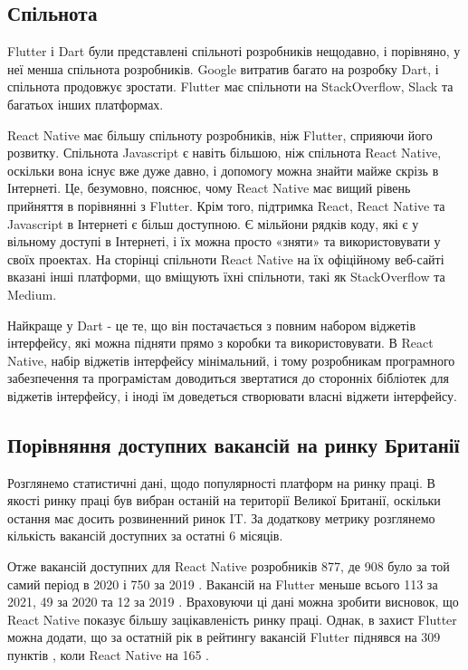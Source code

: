 \subsection{Спільнота}
\label{subsec:communities}

Flutter і Dart були представлені спільноті розробників нещодавно, і порівняно, у неї менша спільнота розробників.
Google витратив багато на розробку Dart, і спільнота продовжує зростати.
Flutter має спільноти на StackOverflow, Slack та багатьох інших платформах.

React Native має більшу спільноту розробників, ніж Flutter, сприяючи його розвитку.
Спільнота Javascript є навіть більшою, ніж спільнота React Native, оскільки вона існує вже дуже давно, і допомогу можна знайти майже скрізь в Інтернеті.
Це, безумовно, пояснює, чому React Native має вищий рівень прийняття в порівнянні з Flutter.
Крім того, підтримка React, React Native та Javascript в Інтернеті є більш доступною.
Є мільйони рядків коду, які є у вільному доступі в Інтернеті, і їх можна просто «зняти» та використовувати у своїх проектах.
На сторінці спільноти React Native на їх офіційному веб-сайті вказані інші платформи, що вміщують їхні спільноти, такі як StackOverflow та Medium.

Найкраще у Dart - це те, що він постачається з повним набором віджетів інтерфейсу, які можна підняти прямо з коробки та використовувати.
В React Native, набір віджетів інтерфейсу мінімальний, і тому розробникам програмного забезпечення та програмістам доводиться звертатися до сторонніх бібліотек для віджетів інтерфейсу, і іноді їм доведеться створювати власні віджети інтерфейсу.

\subsection{Порівняння доступних вакансій на ринку Британії}
\label{subsec:market_comparisson}
Розглянемо статистичні дані, щодо популярності платформ на ринку праці.
В якості ринку праці був вибран останій на території Великої Британії, оскільки остання має досить розвиненний ринок IT.
За додаткову метрику розглянемо кількість вакансій доступних за остатні 6 місяців.

Отже вакансій доступних для React Native розробників 877, де 908 було за той самий період в 2020 і 750 за 2019 \cite{react_native_jobs}.
Вакансій на Flutter меньше всього 113 за 2021, 49 за 2020 та 12 за 2019 \cite{flutter_jobs}.
Враховуючи ці дані можна зробити висновок, що React Native показує більшу зацікавленість ринку праці.
Однак, в захист Flutter можна додати, що за остатній рік в рейтингу вакансій Flutter піднявся на 309 пунктів \cite{flutter_jobs}, коли React Native на 165 \cite{react_native_jobs}.

